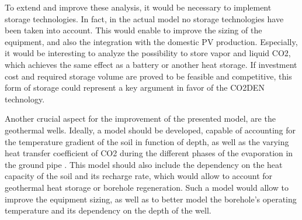 \documentclass{article}
\begin{document}
To extend and improve these analysis, it would be necessary to implement storage technologies. In fact, in the actual model no storage technologies have been taken into account. This would enable to improve the sizing of the equipment, and also the integration with the domestic PV production. Especially, it would be interesting to analyze the possibility to store vapor and liquid CO2, which achieves the same effect as a battery or another heat storage. If investment cost and required storage volume are proved to be feasible and competitive, this form of storage could represent a key argument in favor of the CO2DEN technology.

Another crucial aspect for the improvement of the presented model, are the geothermal wells. 
Ideally, a model should be developed, capable of accounting for the temperature gradient of the soil in function of depth, as well as the varying heat transfer coefficient of CO2 during the different phases of the evaporation in the ground pipe \cite{badacheExperimentalStudyCarbon2018,lamarcheReviewMethodsEvaluate2010}.
This model should also include the dependency on the heat capacity of the soil and its recharge rate\cite{jiaReviewEffectiveThermal2019,lamarcheReviewMethodsEvaluate2010,zengHeatTransferAnalysis2003a}, which would allow to account for geothermal heat storage or borehole regeneration.
Such a model would allow to improve the equipment sizing, as well as to better model the borehole's operating temperature and its dependency on the depth of the well.
 

\clearpage


\clearpage
\appendix	



\end{document}
